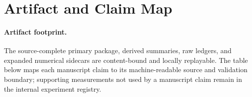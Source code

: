 \documentclass{article}
\begin{document}
\section{Artifact and Claim Map}
\label{app:artifact}

\paragraph{Artifact footprint.}
The source-complete primary package, derived summaries, raw ledgers, and expanded
numerical sidecars are content-bound and locally replayable.  The table below
maps each manuscript claim to its machine-readable source and validation
boundary; supporting measurements not used by a manuscript claim remain in
the internal experiment registry.

\begingroup
\footnotesize
\setlength{\LTpre}{0.5\baselineskip}
\setlength{\LTpost}{0pt}
\end{document}
